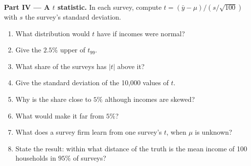 \begin{problem}
\medskip\noindent\textbf{Part IV --- A $t$ statistic.} In each survey, compute
$t = (\bar y - \mu)/(s/\sqrt{100})$ with $s$ the survey's standard deviation.
\begin{enumerate}[resume]
  \item What distribution would $t$ have if incomes were normal?
  \item Give the $2.5\%$ upper  of $t_{99}$.
  \item What share of the surveys has $|t|$ above it?
  \item Give the standard deviation of the 10,000 values of $t$.
  \item Why is the share close to $5\%$ although incomes are skewed?
  \item What would make it far from $5\%$?
  \item What does a survey firm learn from one survey's $t$, when $\mu$ is unknown?
  \item State the result: within what distance of the truth is the mean income of 100 households in $95\%$ of surveys?
\end{enumerate}
\end{problem}
